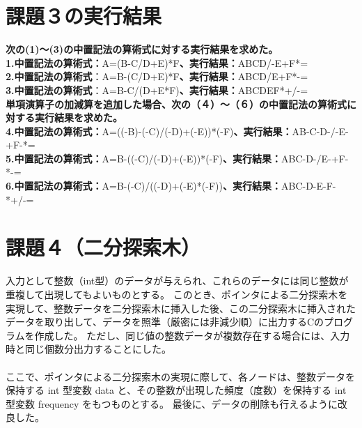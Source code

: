 \documentclass[]{jsarticle}
\begin{document}
\section*{課題３の実行結果}
\noindent\textbf{次の(1)〜(3)の中置記法の算術式に対する実行結果を求めた。}\\
\textbf{1.中置記法の算術式：}A=(B-C/D+E)*F\textbf{、実行結果：}ABCD/-E+F*=\\
\textbf{2.中置記法の算術式}：A=B-(C/D+E)*F\textbf{、実行結果：}ABCD/E+F*-=\\
\textbf{3.中置記法の算術式}：A=B-C/(D+E*F)\textbf{、実行結果：}ABCDEF*+/-=\\

\noindent\textbf{単項演算子の加減算を追加した場合、次の（４）〜（６）の中置記法の算術式に対する実行結果を求めた。}\\
\textbf{4.中置記法の算術式：}A=((-B)-(-C)/(-D)+(-E))*(-F)\textbf{、実行結果：}AB-C-D-/-E-+F-*=\\
\textbf{5.中置記法の算術式：}A=B-((-C)/(-D)+(-E))*(-F)\textbf{、実行結果：}ABC-D-/E-+F-*-=\\
\textbf{6.中置記法の算術式：}A=B-(-C)/((-D)+(-E)*(-F))\textbf{、実行結果：}ABC-D-E-F-*+/-=\\

\newpage
\section*{課題４（二分探索木）}
入力として整数（int型）のデータが与えられ、これらのデータには同じ整数が重複して出現してもよいものとする。
このとき、ポインタによる二分探索木を実現して、整数データを二分探索木に挿入した後、この二分探索木に挿入されたデータを取り出して、データを照準（厳密には非減少順）に出力するCのプログラムを作成した。
ただし、同じ値の整数データが複数存在する場合には、入力時と同じ個数分出力することにした。\\
\\ここで、ポインタによる二分探索木の実現に際して、各ノードは、整数データを保持する int 型変数 data と、その整数が出現した頻度（度数）を保持する int 型変数 frequency をもつものとする。
最後に、データの削除も行えるように改良した。\\
\end{document}
